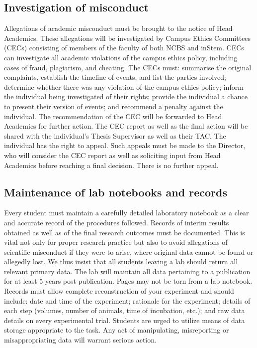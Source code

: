 \documentclass[a4paper,10pt]{article}
\begin{document}
\subsection{Investigation of misconduct} Allegations of academic misconduct must
be brought to the notice of Head Academics. These allegations will be
investigated by Campus Ethics Committees (CECs) consisting of members of the
faculty of both NCBS and inStem. CECs can investigate all academic violations of
the campus ethics policy, including cases of fraud, plagiarism, and cheating.
The CECs must: summarise the original complaints, establish the timeline of
events, and list the parties involved; determine whether there was any violation
of the campus ethics policy; inform the individual being investigated of their
rights; provide the individual a chance to present their version of events; and
recommend a penalty against the individual. The recommendation of the CEC will
be forwarded to Head Academics for further action. The CEC report as well as the
final action will be shared with the individual’s Thesis Supervisor as well as
their TAC. The individual has the right to appeal. Such appeals must be made to
the Director, who will consider the CEC report as well as soliciting input from
Head Academics before reaching a final decision. There is no further appeal.

\subsection{Maintenance of lab notebooks and records} Every student must
maintain a carefully detailed laboratory notebook as a clear and accurate record
of the procedures followed.  Records of interim results obtained as well as of
the final research outcomes must be documented. This is vital not only for
proper research practice but also to avoid allegations of scientific misconduct
if they were to arise, where original data cannot be found or allegedly lost. We
thus insist that all students leaving a lab should return all relevant primary
data. The lab will maintain all data pertaining to a publication for at least 5
years post publication. Pages may not be torn from a lab notebook. Records must
allow complete reconstruction of your experiment and should include: date and
time of the experiment; rationale for the experiment; details of each step
(volumes, number of animals, time of incubation, etc.); and raw data details on
every experimental trial. Students are urged to utilize means of data storage
appropriate to the task. Any act of manipulating, misreporting or
misappropriating data will warrant serious action.
\end{document}
